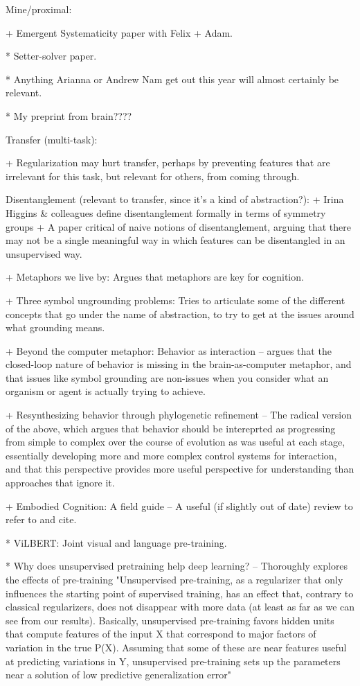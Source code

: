 Mine/proximal:

+ Emergent Systematicity paper with Felix + Adam.

* Setter-solver paper.

* Anything Arianna or Andrew Nam get out this year will almost certainly be relevant.

* My preprint from brain????


Transfer (multi-task):

+ Regularization may hurt transfer, perhaps by preventing features that are irrelevant for this task, but relevant for others, from coming through. \citep{Kornblith2019} 

    Disentanglement (relevant to transfer, since it's a kind of abstraction?):
        + Irina Higgins & colleagues define disentanglement formally in terms of symmetry groups \citep{Higgins2018}
        + A paper critical of naive notions of disentanglement, arguing that there may not be a single meaningful way in which features can be disentangled in an unsupervised way. \citep{Locatello2019}

+ Metaphors we live by: Argues that metaphors are key for cognition. \citep{Lakoff2008} 

+ Three symbol ungrounding problems: Tries to articulate some of the different concepts that go under the name of abstraction, to try to get at the issues around what grounding means. \citep{Dove2016}

+ Beyond the computer metaphor: Behavior as interaction -- argues that the closed-loop nature of behavior is missing in the brain-as-computer metaphor, and that issues like symbol grounding are non-issues when you consider what an organism or agent is actually trying to achieve. \citep{Cisek1999}

+ Resynthesizing behavior through phylogenetic refinement -- The radical version of the above, which argues that behavior should be intereprted as progressing from simple to complex over the course of evolution as was useful at each stage, essentially developing more and more complex control systems for interaction, and that this perspective provides more useful perspective for understanding than approaches that ignore it. \citep{Cisek2019}

+ Embodied Cognition: A field guide -- A useful (if slightly out of date) review to refer to and cite. \citep{Anderson2003}

* ViLBERT: Joint visual and language pre-training. \citep{Lu2019}

* Why does unsupervised pretraining help deep learning? -- Thoroughly explores the effects of pre-training
"Unsupervised pre-training, as a regularizer that only influences the starting point of
supervised training, has an effect that, contrary to classical regularizers, does not disappear with
more data (at least as far as we can see from our results). Basically, unsupervised pre-training favors
hidden units that compute features of the input X that correspond to major factors of variation in
the true P(X). Assuming that some of these are near features useful at predicting variations in Y,
unsupervised pre-training sets up the parameters near a solution of low predictive generalization error" \citep{Erhan2010}

